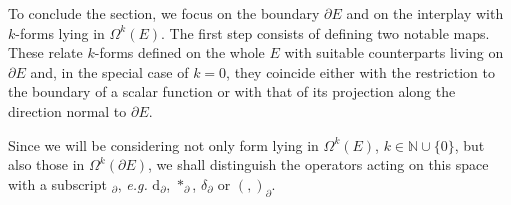 %
%

To conclude the section, we focus on the boundary $\partial E$ and on the interplay with $k$-forms lying in $\Omega^k(E)$. The first step consists of defining two notable maps. These relate $k$-forms defined on the whole $E$ with suitable counterparts living on $\partial E$ and, in the special case of $k=0$, they coincide either with the restriction to the boundary of a scalar function or with that of its projection along the direction normal to $\partial E$.

\begin{remark}
	Since we will be considering not only form lying in $\Omega^k(E)$, $k\in\mathbb{N}\cup\{0\}$, but also those in $\Omega^k(\partial E)$, we shall distinguish the operators acting on this space with a subscript $_\partial$, {\it e.g.} $\mathrm{d}_\partial$, $\ast_\partial$, $\delta_\partial$ or $(,)_\partial$.
\end{remark}



